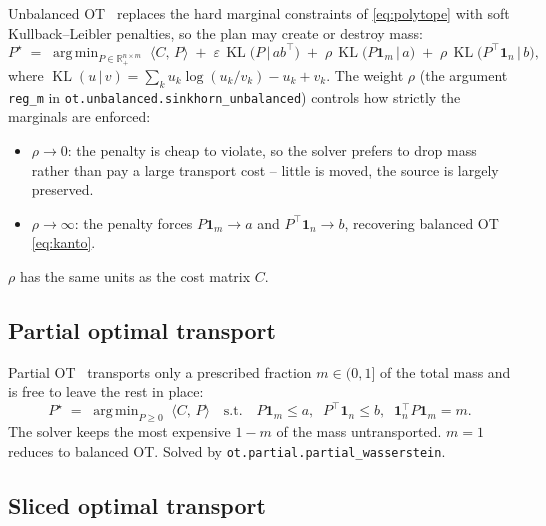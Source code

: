 \documentclass[11pt,a4paper]{article}
\newcommand{\R}{\mathbb{R}}
\newcommand{\one}{\mathbf{1}}
\newcommand{\KL}{\operatorname{KL}}
\newcommand{\inner}[2]{\langle #1,\, #2 \rangle}
\newcommand{\code}[1]{\texttt{#1}}
\DeclareMathOperator*{\argmin}{arg\,min}
\begin{document}
Unbalanced OT~\cite{chizat2018} replaces the hard marginal constraints of
\cref{eq:polytope} with soft Kullback--Leibler penalties, so the plan may create
or destroy mass:
\begin{equation}
  \label{eq:unbalanced}
  P^\star
  \;=\; \argmin_{P \in \R_+^{n\times m}}
  \; \inner{C}{P}
  \;+\; \varepsilon\, \KL\!\bigl(P \,\big|\, a b^\top\bigr)
  \;+\; \rho\, \KL\!\bigl(P\one_m \,\big|\, a\bigr)
  \;+\; \rho\, \KL\!\bigl(P^\top\one_n \,\big|\, b\bigr),
\end{equation}
where $\KL(u \,|\, v) = \sum_k u_k \log(u_k / v_k) - u_k + v_k$.
The weight $\rho$ (the argument \code{reg\_m} in
\code{ot.unbalanced.sinkhorn\_unbalanced}) controls how strictly the marginals
are enforced:
\begin{itemize}
  \item $\rho \to 0$: the penalty is cheap to violate, so the solver prefers to
        drop mass rather than pay a large transport cost -- little is moved, the
        source is largely preserved.
  \item $\rho \to \infty$: the penalty forces $P\one_m \to a$ and
        $P^\top\one_n \to b$, recovering balanced OT \cref{eq:kanto}.
\end{itemize}
$\rho$ has the same units as the cost matrix $C$.

\subsection{Partial optimal transport}

Partial OT~\cite{chapel2020} transports only a prescribed fraction
$m \in (0,1]$ of the total mass and is free to leave the rest in place:
\begin{equation}
  \label{eq:partial}
  P^\star
  \;=\; \argmin_{P \ge 0}
  \; \inner{C}{P}
  \quad \text{s.t.} \quad
  P\one_m \le a,\;\;
  P^\top\one_n \le b,\;\;
  \one_n^\top P \one_m = m .
\end{equation}
The solver keeps the most expensive $1-m$ of the mass untransported. $m=1$
reduces to balanced OT. Solved by \code{ot.partial.partial\_wasserstein}.

\subsection{Sliced optimal transport}
\end{document}
